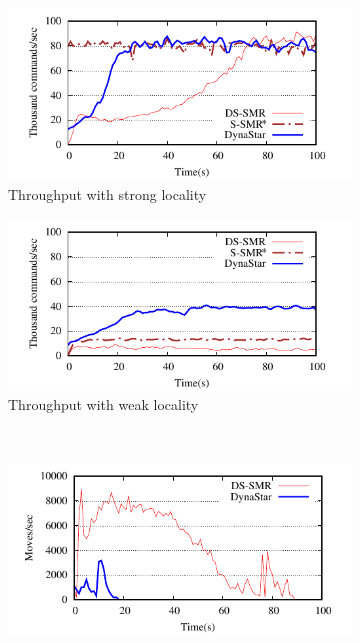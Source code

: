 \begin{figure}[ht!]
  \centering
  \begin{subfigure}[b]{0.45\textwidth}
    \centering
    \includegraphics[width=0.95\columnwidth]{figures/experiments/dynastar/socc-tp-strong-locality}
    \caption{Throughput with strong locality}
  \end{subfigure}
  \begin{subfigure}[b]{0.45\textwidth}
    \centering
    \includegraphics[width=0.95\columnwidth]{figures/experiments/dynastar/socc-tp-weak-locality}
    \caption{Throughput with weak locality}
  \end{subfigure} \\
  \begin{subfigure}[b]{0.45\textwidth}
    \centering
    \includegraphics[width=0.95\columnwidth]{figures/experiments/dynastar/socc-moves-strong-locality}

\end{subfigure}
\end{figure}
